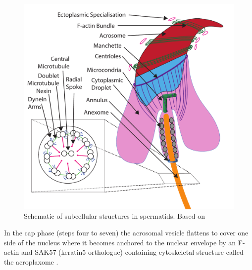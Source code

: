 \begin{figure}[H]
	\centering
	\includegraphics[width=\textwidth]{figures/intro/spermatozoa.pdf}
	\caption[Spermatids]{Schematic of subcellular structures in spermatids. Based on \parencite{Dunleavy2019cytoskeleton, Wei2018acroframosomeacroplaxomemanchette, ODonnell2012Essential, Kopera2010Sertoli, Wang2019Insight, Gunes2020Microtubular}}
	\label{fig:Spermatids}
\end{figure}


In the cap phase (steps four to seven) the acrosomal vesicle flattens to cover one side of the nucleus where it becomes anchored to the nuclear envelope by an F-actin and SAK57 (keratin5 orthologue) containing cytoskeletal structure called the acroplaxome \parencite{Kierszenbaum2003Acroplaxome, Kierszenbaum2004acrosomeacroplaxomemanchette}.

